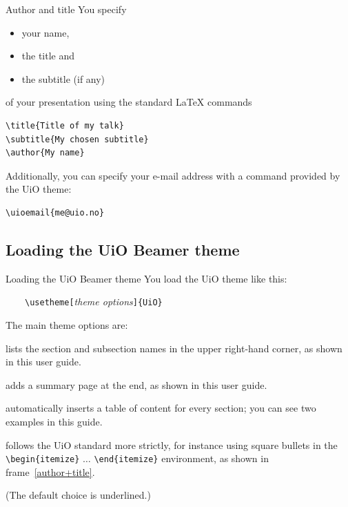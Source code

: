 \documentclass[UKenglish,aspectratio=169]{beamer}
\newcommand{\Dots}{\ensuremath{\ldots}}
\newcommand{\p}[1]{\texttt{#1}}
\newcommand{\pb}[1]{\textbf{\p{#1}}}
\newcommand{\pcmd}[1]{\p{\textbackslash #1}}
\newcommand{\penv}[1]{\pcmd{begin}\ppar{#1} \Dots{} \pcmd{end}\ppar{#1}}
\newcommand{\ppar}[1]{\p{\{#1\}}}
\begin{document}
\begin{frame}[fragile,label=author+title]{Author and title}
  You specify
  \begin{itemize}
  \item your name, 
  \item the title and 
  \item the subtitle (if any)
  \end{itemize}
  of your presentation using the standard \LaTeX{} commands

  \medskip
  \begin{Verbatim}[fontsize=\footnotesize]
\title{Title of my talk}
\subtitle{My chosen subtitle}    
\author{My name}
  \end{Verbatim}

  \bigskip
  Additionally, you can specify your e-mail address with a command
  provided by the UiO theme:

  \medskip
  \begin{Verbatim}[fontsize=\footnotesize]
\uioemail{me@uio.no}
  \end{Verbatim}
\end{frame}

\subsection{Loading the UiO Beamer theme}

\newcommand{\falseTRUE}{=false|\underline{true}}
\newcommand{\FALSEtrue}{=\underline{false}|true}

\begin{frame}{Loading the UiO Beamer theme}
  You load the UiO theme like this:

  \medskip
  ~~~~\pcmd{usetheme}\p{[}\textit{theme options}\p{]}\ppar{UiO}

  \medskip
  The main theme options are:
  \begin{description}[\pb{toc}]
  \item[\pb{sectionheaders\falseTRUE} ] lists the section and
    subsection names in the upper right-hand corner, as shown in this
    user guide.
  \item[\pb{summary\FALSEtrue} ] adds a summary page at the end, as shown in this
    user guide.
  \item[\pb{toc\FALSEtrue} ] automatically inserts a table of content for every
    section; you can see two examples in this guide.
  \item[\pb{uiostandard\FALSEtrue} ] follows the UiO standard more
    strictly, for instance using square bullets in the
    \penv{itemize} environment, as shown in frame~\ref{author+title}.
  \end{description}
  \medskip
  \footnotesize (The default choice is underlined.)
\end{frame}
\end{document}
